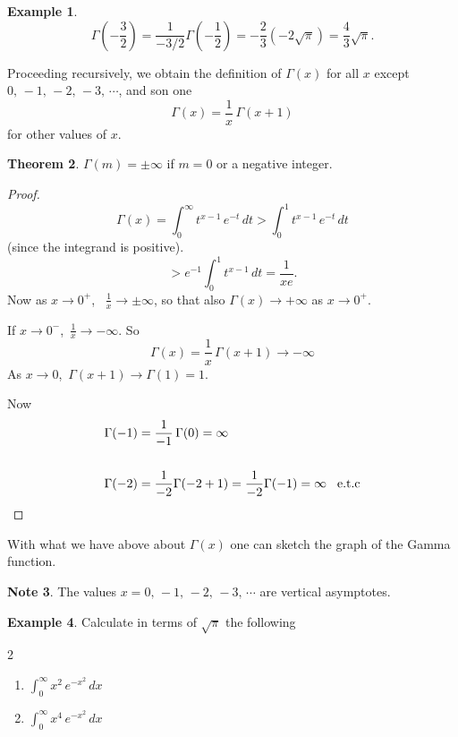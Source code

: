 \documentclass[12pt,a4paper]{report}
\theoremstyle{definition}
\newtheorem{thm}{Theorem}[section]
\newtheorem{exa}[thm]{Example}
\newtheorem{note}[thm]{Note}
\theoremstyle{plain}
\begin{document}
\begin{exa}
$$\Gamma\left(-\frac{3}{2}\right)  = \frac{1}{-3/2}\Gamma\left(-\frac{1}{2}\right) = -\frac{2}{3}(-2\sqrt{\pi}) = \frac{4}{3}\sqrt{\pi}.$$
\end{exa}



Proceeding recursively, we obtain the definition of $\Gamma(x)$ for all $x$ except $0, \, -1, \, -2, \, -3, \, \cdots$, and son one $$\Gamma(x) = \frac{1}{x}\, \Gamma(x + 1)$$ for other values of $x$.



\begin{thm}
$\Gamma(m) = \pm \infty$ if $m = 0$ or a negative integer.
\end{thm}

\begin{proof}
$$\Gamma(x) = \int_0^{\infty}t^{x - 1}\, e^{-t}\, dt > \int_0^{1}t^{x-1}\, e^{-t}\, dt$$ (since the integrand is positive).
$$ > e^{-1} \int_0^1t^{x-1}\, dt = \frac{1}{xe}.$$
Now as $x\rightarrow 0^+$, \, $\frac{1}{x}\rightarrow \pm \infty$, so that also $\Gamma(x) \rightarrow +\infty$ as $x\rightarrow 0^+.$

If $x \rightarrow 0^-$, $\, \frac{1}{x}\rightarrow -\infty$. So 
$$\Gamma(x) = \frac{1}{x}\, \Gamma(x + 1) \rightarrow -\infty$$ As $x\rightarrow 0$, $\, \Gamma(x + 1) \rightarrow \Gamma(1) = 1.$

Now 
\begin{align*}
\Gamma(-1) & = \frac{1}{-1}\, \Gamma(0) = \infty\\\\
\Gamma(-2) & = \frac{1}{-2}\Gamma(-2 + 1) = \frac{1}{-2}\Gamma(-1) = \infty \hspace{0.3cm} \text{e.t.c}
\end{align*}
\end{proof}

With what we have above about $\Gamma(x)$ one can sketch the graph of the Gamma function.

\begin{note}
The values $x = 0,\, -1,\, -2,\, -3,\, \cdots$ are vertical asymptotes.
\end{note}






\begin{exa}
Calculate in terms of $\sqrt{\pi}$ the following 
\begin{multicols}{2}
\begin{enumerate}
\item[(a).] $\displaystyle{\int_0^{\infty} x^2 \, e^{-x^2}\, dx}$
\item[(b).] $\displaystyle{\int_0^{\infty} x^4\, e^{-x^2}\, dx}$
\end{enumerate}
\end{multicols}
\end{exa}
\end{document}
